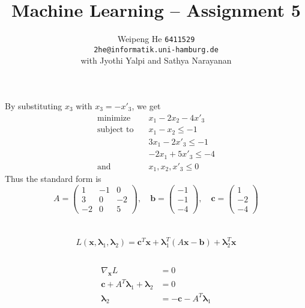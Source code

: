 \documentclass{article}[11pt]
\title{Machine Learning -- Assignment 5}
\author{Weipeng He \texttt{6411529} \\ \texttt{2he@informatik.uni-hamburg.de}  \\ with Jyothi Yalpi and Sathya Narayanan}
\begin{document}
\maketitle

\section{}
By substituting $x_3$ with $x_3=-x'_3$, we get
\begin{align*}
  \text{minimize} \quad & x_1 - 2x_2 - 4x'_3 \\
    \text{subject to} \quad & x_1 - x_2 \le -1 \\ 
  & 3x_1 - 2x'_3 \le -1 \\ 
  & -2x_1 + 5x'_3 \le -4 \\ 
    \text{and} \quad & x_1, x_2, x'_3 \le 0
\end{align*}
Thus the standard form is
\[
  A = \begin{pmatrix}
    1 & -1 & 0 \\
    3 & 0 & -2 \\
    -2 & 0 & 5 
  \end{pmatrix}, \quad
  \mathbf{b} = \begin{pmatrix} -1 \\ -1 \\ -4 \end{pmatrix}, \quad
  \mathbf{c} = \begin{pmatrix} 1 \\ -2 \\ -4 \end{pmatrix}
\]

\section{}
\[
  L(\mathbf{x}, \boldsymbol{\lambda}_1, \boldsymbol{\lambda}_2) = \mathbf{c}^T\mathbf{x} + \boldsymbol{\lambda}_1^T (A\mathbf{x} - \mathbf{b}) + \boldsymbol{\lambda}_2^T \mathbf{x}
\]

\subsection{}
\begin{align*}
  \nabla_{\mathbf{x}} L &= 0 \\
  \mathbf{c} + A^T \boldsymbol{\lambda}_1 + \boldsymbol{\lambda}_2 &= 0 \\
  \boldsymbol{\lambda}_2 &= -\mathbf{c} - A^T \boldsymbol{\lambda}_1
\end{align*}
\end{document}
